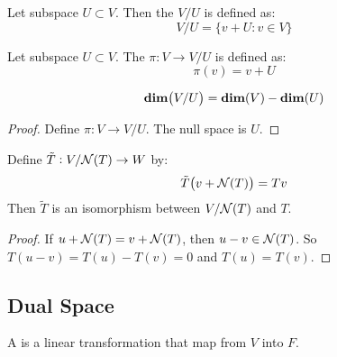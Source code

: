 \begin{definition}
    Let subspace $U \subset V$. Then the  $V/U$ is defined as:
    \begin{equation}
        V/U = \{ v + U: v \in V \}
    \end{equation}
\end{definition}

\begin{definition}
    Let subspace $U \subset V$. The  $\pi: V \rightarrow V/U$ is defined as:
    \begin{equation}
        \pi(v) = v + U
    \end{equation}
\end{definition}

\begin{theorem}
    \begin{equation}
        \dimension{V/U} = \dimension{V} - \dimension{U}
    \end{equation}
\end{theorem}

\begin{proof}
    Define $\pi : V \rightarrow V/U$. The null space is $U$.
\end{proof}

\begin{theorem}
    Define $\tilde{T}: V/\mathcal{N}(T) \rightarrow W$ by:
    \begin{equation*}
        \tilde{T}\mleft(v + \nullspace{T} \mright) = Tv
    \end{equation*}
    Then $\tilde{T}$ is an isomorphism between $V/\mathcal{N}(T)$ and $T$.
\end{theorem}
\begin{proof}
    If $u + \mathcal{N}(T) = v + \mathcal{N}(T)$, then $u - v \in \mathcal{N}(T)$. So $T(u - v) = T(u) - T(v) = 0$ and $T(u) = T(v)$.
\end{proof}



\subsection{Dual Space}


\begin{definition}
	A  is a linear transformation that map from $V$ into $F$.
\end{definition}

